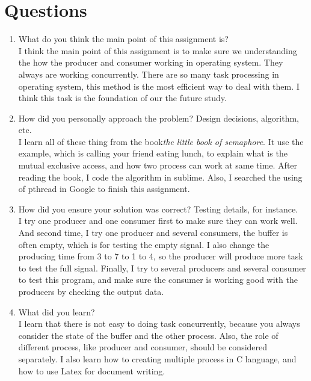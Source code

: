 \documentclass[10pt,letterpaper,onecolumn]{IEEEtran}
\begin{document}
\section{Questions}
\begin{enumerate}
	\item{What do you think the main point of this assignment is?}\\
    I think the main point of this assignment is to make sure we understanding the how the producer and consumer working in operating system. They always are working concurrently. There are so many task processing in operating system, this method is the most efficient way to deal with them. I think this task is the foundation of our the future study.
    \item{How did you personally approach the problem? Design decisions, algorithm, etc.}\\
    I learn all of these thing from the book\emph{the little book of semaphore}. It use the example, which is calling your friend eating lunch, to explain what is the mutual exclusive access, and how two process can work at same time. After reading the book, I code the algorithm in sublime. Also, I searched the using of pthread in Google to finish this assignment.
    \item{How did you ensure your solution was correct? Testing details, for instance.}\\
    I try one producer and one consumer first to make sure they can work well. And second time, I try one producer and several consumers, the buffer is often empty, which is for testing the empty signal. I also change the producing time from 3 to 7 to 1 to 4, so the producer will produce more task to test the full signal. Finally, I try to several producers and several consumer to test this program, and make sure the consumer is working good with the producers by checking the output data.
    \item{What did you learn?}\\
    I learn that there is not easy to doing task concurrently, because you always consider the state of the buffer and the other process. Also, the role of different process, like producer and consumer, should be considered separately. I also learn how to creating multiple process in C language, and how to use Latex for document writing.   
\end{enumerate}
\end{document}

